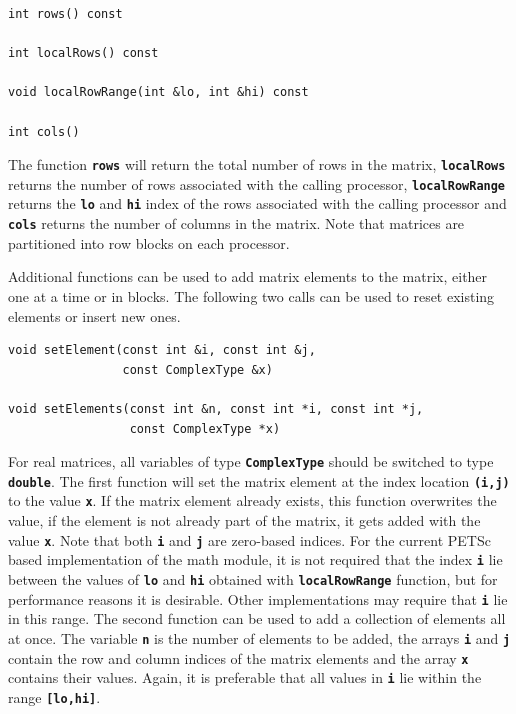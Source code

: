 \documentclass[12pt]{report} %
\begin{document}
{
\color{red}
\begin{Verbatim}[fontseries=b]
int rows() const

int localRows() const

void localRowRange(int &lo, int &hi) const

int cols()
\end{Verbatim}
}

The function \texttt{\textbf{rows}} will return the total number of rows in the matrix, \texttt{\textbf{localRows}} returns the number of rows associated with the calling processor, \texttt{\textbf{localRowRange}} returns the \texttt{\textbf{lo}} and \texttt{\textbf{hi}} index of the rows associated with the calling processor and \texttt{\textbf{cols}} returns the number of columns in the matrix. Note that matrices are partitioned into row blocks on each processor.

Additional functions can be used to add matrix elements to the matrix, either one at a time or in blocks. The following two calls can be used to reset existing elements or insert new ones.

{
\color{red}
\begin{Verbatim}[fontseries=b]
void setElement(const int &i, const int &j,
                const ComplexType &x)

void setElements(const int &n, const int *i, const int *j,
                 const ComplexType *x)
\end{Verbatim}
}

For real matrices, all variables of type \texttt{\textbf{ComplexType}} should be switched to type \texttt{\textbf{double}}. The first function will set the matrix element at the index location \texttt{\textbf{(i,j)}} to the value \texttt{\textbf{x}}. If the matrix element already exists, this function overwrites the value, if the element is not already part of the matrix, it gets added with the value \texttt{\textbf{x}}. Note that both \texttt{\textbf{i}} and \texttt{\textbf{j}} are zero-based indices. For the current PETSc based implementation of the math module, it is not required that the index \texttt{\textbf{i}} lie between the values of \texttt{\textbf{lo}} and \texttt{\textbf{hi}} obtained with \texttt{\textbf{localRowRange}} function, but for performance reasons it is desirable. Other implementations may require that \texttt{\textbf{i}} lie in this range. The second function can be used to add a collection of elements all at once. The variable \texttt{\textbf{n}} is the number of elements to be added, the arrays \texttt{\textbf{i}} and \texttt{\textbf{j}} contain the row and column indices of the matrix elements and the array \texttt{\textbf{x}} contains their values. Again, it is preferable that all values in \texttt{\textbf{i}} lie within the range \texttt{\textbf{[lo,hi]}}.
\end{document}
